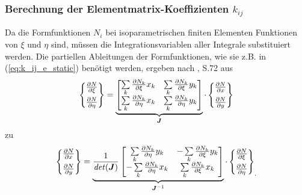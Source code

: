 \subsubsection{Berechnung der Elementmatrix-Koeffizienten $k_{ij}$}

Da die Formfunktionen $N_i$ bei isoparametrischen finiten Elementen Funktionen von $\xi$ und $\eta$ sind, müssen die Integrationsvariablen aller Integrale substituiert werden.  \newline
Die partiellen Ableitungen der Formfunktionen, wie sie z.B. in (\ref{eq:k_ij_e_static}) benötigt werden, ergeben nach \cite{SMS_VO_skript}, S.72 aus
\begin{equation}
\begin{Bmatrix}
\frac{\partial N}{\partial \xi} \\[2mm]
\frac{\partial N}{\partial \eta}
\end{Bmatrix} = 
\underbrace{
\begin{bmatrix}
\sum\limits_{k}\frac{\partial N_k}{\partial \xi}x_k & \sum\limits_{k}\frac{\partial N_k}{\partial \xi}y_k \\[2mm]
\sum\limits_{k}\frac{\partial N_k}{\partial \eta}x_k & \sum\limits_{k}\frac{\partial N_k}{\partial \eta}y_k
\end{bmatrix}}_{\boldsymbol{J}}\cdot
\begin{Bmatrix}
\frac{\partial N}{\partial x} \\[2mm]
\frac{\partial N}{\partial y}
\end{Bmatrix}
\end{equation}
zu
\begin{equation}
\label{eq:partial_derivatives_subst}
\begin{Bmatrix}
\frac{\partial N}{\partial x} \\[2mm]
\frac{\partial N}{\partial y}
\end{Bmatrix} = 
\underbrace{
	\frac{1}{\mathit{det}(\boldsymbol{J})}\begin{bmatrix}
	 \sum\limits_{k}\frac{\partial N_k}{\partial \eta}y_k & -\sum\limits_{k}\frac{\partial N_k}{\partial \xi}y_k \\[2mm]
	-\sum\limits_{k}\frac{\partial N_k}{\partial \eta}x_k & \sum\limits_{k}\frac{\partial N_k}{\partial \xi}x_k
	\end{bmatrix}}_{\boldsymbol{J}^{-1}}
\cdot \left\{ \begin{matrix}
\frac{\partial N}{\partial \xi} \\[2mm]
\frac{\partial N}{\partial \eta}
\end{matrix} \right\}_{.}
\end{equation}


